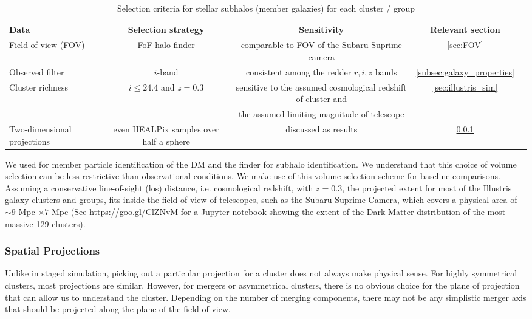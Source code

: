\begin{table*}
\begin{center}
	\caption{ Selection criteria for stellar subhalos (member galaxies) for each
		cluster / group 
\label{tab:member_galaxy_selections}} 

	\begin{tabular}{@{}lcccc@{}}
\hline 
Data &  Selection strategy  & Sensitivity & Relevant section  \\ \hline
Field of view (FOV) & FoF halo finder& comparable to FOV of the Subaru
Suprime camera & \ref{sec:FOV}  \\ 
Observed filter & $i$-band & consistent among the redder $r, i, z$ bands &   
\ref{subsec:galaxy_properties}
\\ 
Cluster richness  & $i \leq 24.4$ and $z = 0.3$  & sensitive to
the assumed cosmological redshift of cluster and & \ref{sec:illustris_sim} \\ 
& & the assumed limiting magnitude of telescope &   \\
Two-dimensional projections & even HEALPix samples over half a sphere &
discussed as results  & \ref{subsubsec:projections}\\  
\hline
\end{tabular} 

\end{center} 
\end{table*}

We used {} for member particle identification of the DM and the 
{} finder for subhalo identification.
We understand that this choice of volume selection can be less restrictive than
observational conditions. We make use of this volume selection scheme
for baseline comparisons. Assuming a conservative line-of-sight (los) distance, 
i.e. cosmological redshift, with  $z = 0.3$, 
the projected extent for most of the Illustris galaxy clusters and groups, 
fits inside the field of view of telescopes, such as the Subaru Suprime Camera,
which covers a physical area of $\sim 9$ Mpc $\times 7$ Mpc 
(See \href{https://goo.gl/ClZNvM}{https://goo.gl/ClZNvM} for a Jupyter notebook 
showing the extent of the Dark Matter distribution of the most massive 129
clusters).

\subsubsection{Spatial Projections}
\label{subsubsec:projections}
Unlike in staged simulation, picking out a particular projection for a cluster 
does not always make physical sense.
For highly symmetrical clusters, most projections are similar. 
However, for mergers or asymmetrical clusters, 
there is no obvious choice for the plane of projection that can allow us to
understand the cluster. Depending on the number of merging components, there
may not be any simplistic merger axis that should be 
projected along the plane of the field of view. 

